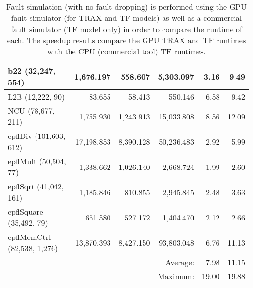\begin{table}[hbtp]
\begin{tabular*}{1.0\columnwidth}{@{\extracolsep{\fill}}|l|rr|r|rr|}
b22 (32,247, 554)               &1,676.197  &558.607                &5,303.097                      &3.16   &9.49\\
\hline
L2B (12,222, 90)                &83.655     &58.413                 &550.146                        &6.58   &9.42\\
NCU (78,677, 211)               &1,755.930  &1,243.913              &15,033.808                     &8.56   &12.09\\
\hline
epflDiv (101,603, 612)          &17,198.853 &8,390.128              &50,236.483                     &2.92   &5.99\\
epflMult (50,504, 77)           &1,338.662  &1,026.140              &2,668.724                      &1.99   &2.60\\
epflSqrt (41,042, 161)          &1,185.846  &810.855                &2,945.845                      &2.48   &3.63\\
epflSquare (35,492, 79)         &661.580    &527.172                &1,404.470                      &2.12   &2.66\\
epflMemCtrl (82,538, 1,276)     &13,870.393 &8,427.150              &93,803.048                     &6.76   &11.13\\
\hline
\multicolumn{4}{|r|}{Average:}                                                                      &7.98   &11.15\\
\multicolumn{4}{|r|}{Maximum:}                                                                      &19.00  &19.88\\
\hline
\end{tabular*}
\caption{Fault simulation (with no fault dropping) is performed using the GPU fault simulator (for TRAX and TF models) as well as a commercial fault simulator (TF model only) in order to compare the runtime of each.
%
The speedup results compare the GPU TRAX and TF runtimes with the CPU (commercial tool) TF runtimes.}
\label{table:trax_exp_gpu_runtime_comparison}
\end{table}

